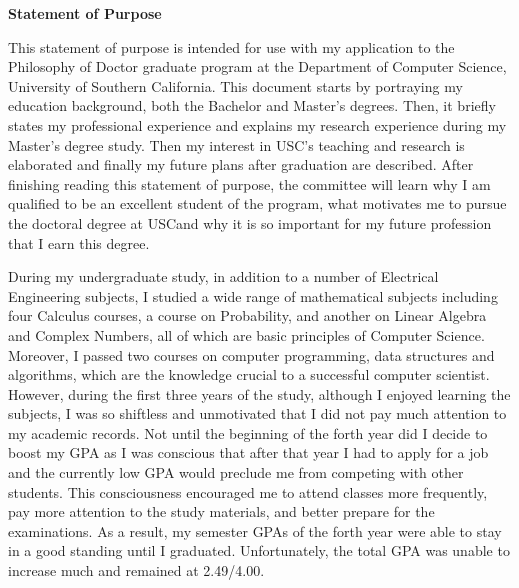 \documentclass[a4paper,10pt]{report}
\newcommand{\university}{University of Southern California}
\newcommand{\department}{Department of Computer Science}
\newcommand{\uniabbre}{USC}
\begin{document}
\begin{center}
\textbf{\large Statement of Purpose}
\end{center}

\vspace{0.4cm}
This statement of purpose is intended for use with my application to the Philosophy of Doctor graduate program at the \department, \university. This document starts by portraying my education background, both the Bachelor and Master's degrees. Then, it briefly states my professional experience and explains my research experience during my Master's degree study. Then my interest in \uniabbre's teaching and research is elaborated and finally my future plans after graduation are described. After finishing reading this statement of purpose, the committee will learn why I am qualified to be an excellent student of the program, what motivates me to pursue the doctoral degree at \uniabbre \space and why it is so important for my future profession that I earn this degree.

\vspace{0.2cm}
During my undergraduate study, in addition to a number of Electrical Engineering subjects, I studied a wide range of mathematical subjects including four Calculus courses, a course on Probability, and another on Linear Algebra and Complex Numbers, all of which are basic principles of Computer Science. Moreover, I passed two courses on computer programming, data structures and algorithms, which are the knowledge crucial to a successful computer scientist. However, during the first three years of the study, although I enjoyed learning the subjects, I was so shiftless and unmotivated that I did not pay much attention to my academic records. Not until the beginning of the forth year did I decide to boost my GPA as I was conscious that after that year I had to apply for a job and the currently low GPA would preclude me from competing with other students. This consciousness encouraged me to attend classes more frequently, pay more attention to the study materials, and better prepare for the examinations. As a result, my semester GPAs of the forth year were able to stay in a good standing until I graduated. Unfortunately, the total GPA was unable to increase much and remained at 2.49/4.00. 
\end{document}

